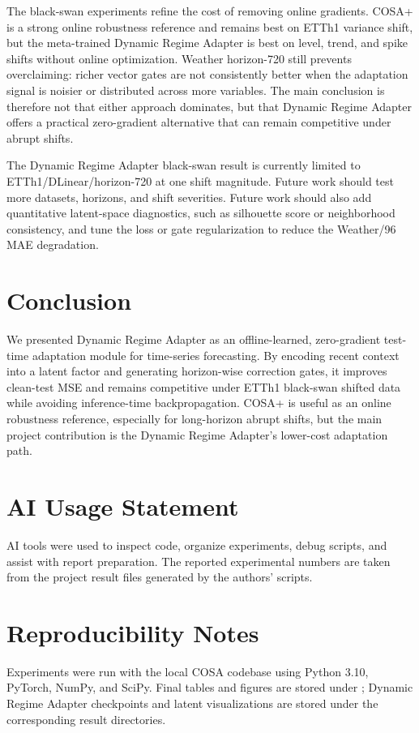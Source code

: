 \documentclass[10pt]{article}
\begin{document}
The black-swan experiments refine the cost of removing online gradients. COSA+ is a strong online robustness reference and remains best on ETTh1 variance shift, but the meta-trained Dynamic Regime Adapter is best on level, trend, and spike shifts without online optimization. Weather horizon-720 still prevents overclaiming: richer vector gates are not consistently better when the adaptation signal is noisier or distributed across more variables. The main conclusion is therefore not that either approach dominates, but that Dynamic Regime Adapter offers a practical zero-gradient alternative that can remain competitive under abrupt shifts.

The Dynamic Regime Adapter black-swan result is currently limited to ETTh1/DLinear/horizon-720 at one shift magnitude. Future work should test more datasets, horizons, and shift severities. Future work should also add quantitative latent-space diagnostics, such as silhouette score or neighborhood consistency, and tune the loss or gate regularization to reduce the Weather/96 MAE degradation.

\section{Conclusion}
We presented Dynamic Regime Adapter as an offline-learned, zero-gradient test-time adaptation module for time-series forecasting. By encoding recent context into a latent factor and generating horizon-wise correction gates, it improves clean-test MSE and remains competitive under ETTh1 black-swan shifted data while avoiding inference-time backpropagation. COSA+ is useful as an online robustness reference, especially for long-horizon abrupt shifts, but the main project contribution is the Dynamic Regime Adapter's lower-cost adaptation path.

\section*{AI Usage Statement}
AI tools were used to inspect code, organize experiments, debug scripts, and assist with report preparation. The reported experimental numbers are taken from the project result files generated by the authors' scripts.


\appendix
\section{Reproducibility Notes}
Experiments were run with the local COSA codebase using Python 3.10, PyTorch, NumPy, and SciPy. Final tables and figures are stored under ; Dynamic Regime Adapter checkpoints and latent visualizations are stored under the corresponding  result directories.
\end{document}
